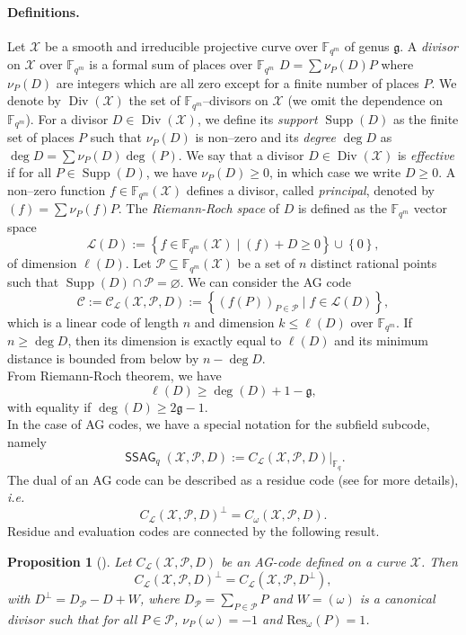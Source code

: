 \documentclass[a4paper]{article}
\newtheorem{proposition}[thm]{Proposition}
\theoremstyle{definition}
\theoremstyle{remark}
\newcommand{\calP}{\mathcal{P}}
\newcommand{\calL}{\mathcal{L}}
\newcommand{\calC}{\mathcal{C}}
\newcommand{\calX}{\mathcal{X}}
\newcommand{\fqm}{\mathbb{F}_{q^m}}
\newcommand{\fq}{\mathbb{F}_{q}}
\newcommand{\set}[1]{\left\{#1\right\}}
\newcommand{\Supp}{\operatorname{Supp}}
\newcommand{\Div}{\operatorname{Div}}
\newcommand{\ssag}[1]{\operatorname{\mathsf{SSAG}}_{q}\left(#1\right)}
\begin{document}
\paragraph{Definitions.} Let $\calX$ be a smooth and irreducible projective curve over $\fqm$ of genus $\mathfrak{g}$. A \emph{divisor} on $\calX$ over $\fqm$ is a formal sum of places over $\fqm$ $D=\sum \nu_P(D) P$ where $\nu_P(D)$ are integers which are all zero except for a finite number of places $P$. We denote by $\Div(\calX)$ the set of $\fqm$--divisors on $\calX$ (we omit the dependence on $\fqm$).
For a divisor $D \in \Div(\calX)$, we define its \emph{support} $\Supp(D)$ as the finite set of places $P$ such that $\nu_P(D)$ is non--zero and its \emph{degree} $\deg D$ as $\deg D=\sum \nu_P(D) \deg(P)$. We say that a divisor $D \in \Div(\calX)$ is \emph{effective} if for all $P \in \Supp(D)$, we have $\nu_P(D) \geq 0$, in which case we write $D \geq 0$.
A non--zero function $f \in \fqm(\calX)$ defines a divisor, called \emph{principal}, denoted by $(f)=\sum \nu_P(f) P$. The \emph{Riemann-Roch space} of $D$ is defined as the $\fqm$ vector space
$$ \calL(D) := \set{f \in \fqm(\calX) \mid (f) + D \geq 0} \cup \set{0},$$
of dimension $\ell(D)$.
Let $\calP \subseteq \fqm(\calX)$ be a set of $n$ distinct rational points such that $\Supp(D) \cap \calP = \varnothing$.
We can consider the AG code 
$$\calC := \calC_{\calL}(\calX,\calP,D) := \set{\left(f(P)\right)_{P \in \calP} \mid f \in \calL(D)},$$
which is a linear code of length $n$ and dimension $k \leq \ell(D)$ over $\fqm$. If $n \geq \deg D$, then its dimension is exactly equal to $\ell(D)$ and its minimum distance is bounded from below by $n-\deg D$.\\
From Riemann-Roch theorem, we have
$$ \ell(D) \geq \deg(D) +1 - \mathfrak{g},$$ 
with equality if $\deg(D) \geq 2\mathfrak{g}-1$.\\
In the case of AG codes, we have a special notation for the subfield subcode, namely
\[\ssag{\calX,\calP,D} := C_{\calL}(\calX,\calP,D)|_{\fq}.\]
The dual of an AG code can be described as a residue code (see \cite{Sti09} for more details), \emph{i.e.}
$$ C_{\calL}(\calX,\calP,D)^{\perp} = C_{\omega}(\calX,\calP,D).$$ 
Residue and evaluation codes are connected by the following result.

\begin{proposition} [{\cite[Proposition~2.2.10]{Sti09}}] \label{prop:dual_AG_codes}
Let $C_{\calL}(\calX,\calP,D)$ be an AG-code defined on a curve $\calX$. Then 
\[C_{\calL}(\calX,\calP,D)^{\perp} = C_{\calL}(\calX,\calP,D^{\perp}),\]
with $D^{\perp} = D_{\calP}-D+W$, where $D_{\calP} = \sum\limits_{P \in \calP} P$ and $W=(\omega)$ is a canonical divisor such that for all $P \in \calP$, $\nu_P(\omega)=-1$ and $\mathrm{Res}_{\omega}(P)=1$. 
\end{proposition}
\end{document}
